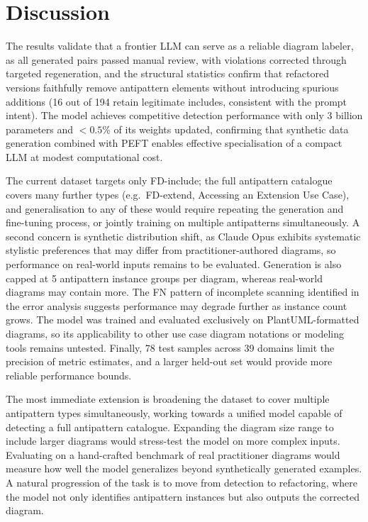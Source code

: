 \documentclass[sigconf,review,anonymous]{acmart}
\begin{document}
\section{Discussion}
\label{sec:discussion}


The results validate that a frontier LLM can serve as a reliable diagram
labeler, as all generated pairs passed manual review, with violations
corrected through targeted regeneration, and the structural statistics
confirm that refactored versions faithfully remove antipattern elements
without introducing spurious additions (16 out of 194 retain legitimate
includes, consistent with the prompt intent).  The model achieves competitive
detection performance with only 3 billion parameters and $<0.5\%$ of its
weights updated, confirming that synthetic data generation combined with
PEFT enables effective specialisation of a compact
LLM at modest computational cost.


The current dataset targets only FD-include; the full antipattern
catalogue~\cite{elattar2006matching,elattar2010improving} covers many
further types (e.g.\ FD-extend, Accessing an Extension Use Case), and
generalisation to any of these would require repeating the generation and
fine-tuning process, or jointly training on multiple antipatterns
simultaneously.  A second concern is synthetic distribution shift, as Claude Opus exhibits
systematic stylistic preferences that may differ from practitioner-authored
diagrams, so performance on real-world inputs remains to be evaluated.  Generation is also capped at 5 antipattern instance
groups per diagram, whereas real-world diagrams may contain more.  The FN pattern of incomplete scanning identified in the error analysis suggests
performance may degrade further as instance count grows.  The model was trained and evaluated exclusively on PlantUML-formatted
diagrams, so its applicability to other use case diagram notations or
modeling tools remains untested.  Finally, 78 test samples across 39 domains
limit the precision of metric estimates, and a larger held-out set would
provide more reliable performance bounds.


The most immediate extension is broadening the dataset to cover multiple antipattern types simultaneously, working towards a unified model capable of detecting a full antipattern catalogue. Expanding the diagram size range to include larger diagrams would stress-test the model on more complex inputs. Evaluating on a hand-crafted benchmark of real practitioner diagrams would measure how well the model generalizes beyond synthetically generated examples. A natural progression of the task is to move from detection to refactoring, where the model not only identifies antipattern instances but also outputs the corrected diagram.
\end{document}
